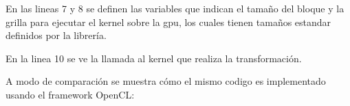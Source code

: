 \documentclass[a4paper,10pt]{report}
\begin{document}

% 
% 
% 


En las lineas 7 y 8 se definen las variables que indican el tamaño del bloque y la grilla para ejecutar el kernel sobre la gpu, los cuales tienen tamaños estandar definidos por la librería.

En la linea 10 se ve la llamada al kernel que realiza la transformación.








A modo de comparación se muestra cómo el mismo codigo es implementado usando el framework OpenCL:
\end{document}
